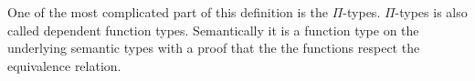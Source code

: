One of the most complicated part of this definition is the $\Pi$-types.
$\Pi$-types is also called dependent function types. Semantically it is a function type on the underlying semantic types with a proof that the the functions respect the equivalence relation. 


\begin{code}\>\<%
\\
%
\\
\> \AgdaSymbol{:} \AgdaSymbol{\{} \AgdaSymbol{:} \AgdaSymbol{\}(} \AgdaSymbol{:}  \AgdaSymbol{)(} \AgdaSymbol{:}  \AgdaSymbol{(} \AgdaFunction{\&} \AgdaSymbol{))}   \<%
\\
%
\\
\>\<\end{code}

